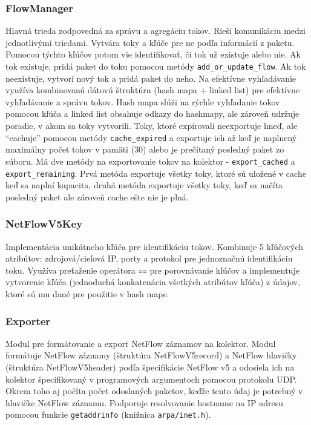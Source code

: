 \documentclass[a4paper, 12pt]{article}
\begin{document}
\subsubsection{FlowManager}
Hlavná trieda zodpovedná za správu a agregáciu tokov. Rieši komunikáciu medzi jednotlivými triedami. Vytvára toky a kľúče pre ne podľa informácií z paketu. Pomocou týchto kľúčov potom vie identifikovať, či tok už existuje alebo nie. Ak tok existuje, pridá paket do toku pomocou metódy \texttt{add\_or\_update\_flow}. Ak tok neexistuje, vytvorí nový tok a pridá paket do neho. Na efektívne vyhľadávanie využíva kombinovanú dátovú štruktúru (hash mapa + linked list) pre efektívne vyhľadávanie a správu tokov. Hash mapa slúži na rýchle vyhľadanie tokov pomocou kľúča a linked list obsahuje odkazy do hashmapy, ale zároveň udržuje poradie, v akom sa toky vytvorili. Toky, ktoré expirovali neexportuje hneď, ale ``cachuje'' pomocou metódy \texttt{cache\_expired} a exportuje ich až keď je naplnený maximálny počet tokov v pamäti (30) alebo je prečítaný posledný paket zo súboru. Má dve metódy na exportovanie tokov na kolektor - \texttt{export\_cached} a \texttt{export\_remaining}. Prvá metóda exportuje všetky toky, ktoré sú uložené v cache keď sa naplní kapacita, druhá metóda exportuje všetky toky, keď sa načíta posledný paket ale zároveň cache ešte nie je plná.

\subsubsection{NetFlowV5Key}
Implementácia unikátneho kľúča pre identifikáciu tokov. Kombinuje 5 kľúčových atribútov: zdrojová/cieľová IP, porty a protokol pre jednoznačnú identifikáciu toku. Využíva preťaženie operátora \texttt{==} pre porovnávanie kľúčov a implementuje vytvorenie kľúča (jednoduchá konkatenácia všetkých atribútov kľúča) z údajov, ktoré sú mu dané pre použitie v hash mape.

\subsubsection{Exporter}
Modul pre formátovanie a export NetFlow záznamov na kolektor. Modul formátuje NetFlow záznamy (štruktúra NetFlowV5record) a NetFlow hlavičky (štruktúra NetFlowV5header) podľa špecifikácie NetFlow v5 a odosiela ich na kolektor špecifikovaný v programových argumentoch pomocou protokolu UDP. Okrem toho aj počíta počet odoslaných paketov, keďže tento údaj je potrebný v hlavičke NetFlow záznamu. Podporuje resolvovanie hostname na IP adresu pomocou funkcie \texttt{getaddrinfo} (knižnica \texttt{arpa/inet.h}).
\end{document}
